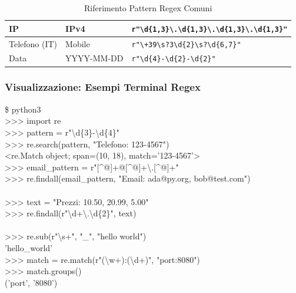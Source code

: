 \begin{tcolorbox}[title={Per chi viene da C/Java/JS: stringhe, bytes ed encoding}]
\begin{table}[h]
\begin{tabular}{|l|l|p{6cm}|}
IP & IPv4 & \texttt{r"\textbackslash d\{1,3\}\textbackslash .\textbackslash d\{1,3\}\textbackslash .\textbackslash d\{1,3\}\textbackslash .\textbackslash d\{1,3\}"} \\ \hline
Telefono (IT) & Mobile & \texttt{r"\textbackslash +39\textbackslash s?3\textbackslash d\{2\}\textbackslash s?\textbackslash d\{6,7\}"} \\ \hline
Data & YYYY-MM-DD & \texttt{r"\textbackslash d\{4\}-\textbackslash d\{2\}-\textbackslash d\{2\}"} \\ \hline
\end{tabular}
\caption{Riferimento Pattern Regex Comuni}
\end{table}

\subsubsection{Visualizzazione: Esempi Terminal Regex}
\begin{center}
\begin{tcolorbox}[title={Esempi Terminal: Pattern Matching con Regex}, colback=black!5, colframe=blue!60, width=0.95\textwidth, fontupper=\ttfamily\small]
\textcolor{green!60!black}{\$ python3}\\
\textcolor{blue!80}{>>> import re}\\
\textcolor{blue!80}{>>> pattern = r"\textbackslash d\{3\}-\textbackslash d\{4\}"}\\
\textcolor{blue!80}{>>> re.search(pattern, "Telefono: 123-4567")}\\
<re.Match object; span=(10, 18), match='123-4567'>\\[4pt]
\textcolor{blue!80}{>>> email\_pattern = r"[\textasciicircum @]+@[\textasciicircum @]+\textbackslash .[\textasciicircum @]+"}\\
\textcolor{blue!80}{>>> re.findall(email\_pattern, "Email: ada@py.org, bob@test.com")}\\
['ada@py.org', 'bob@test.com']\\[4pt]
\textcolor{blue!80}{>>> text = "Prezzi: 10.50, 20.99, 5.00"}\\
\textcolor{blue!80}{>>> re.findall(r"\textbackslash d+\textbackslash .\textbackslash d\{2\}", text)}\\
['10.50', '20.99', '5.00']\\[4pt]
\textcolor{blue!80}{>>> re.sub(r"\textbackslash s+", "\_", "hello   world")}\\
'hello\_world'\\[4pt]
\textcolor{blue!80}{>>> match = re.match(r"(\textbackslash w+):(\textbackslash d+)", "port:8080")}\\
\textcolor{blue!80}{>>> match.groups()}\\
('port', '8080')
\end{tcolorbox}
\end{center}

\end{tcolorbox}